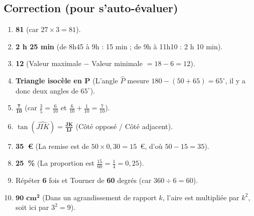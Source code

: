 \documentclass[a4paper,11pt]{article}
\begin{document}
\subsection*{Correction (pour s'auto-évaluer)}
\begin{enumerate}[label=\textbf{\arabic*.}]
    \item \textbf{81} (car $27 \times 3 = 81$).
    \item \textbf{2 h 25 min} (de 8h45 à 9h : 15 min ; de 9h à 11h10 : 2 h 10 min).
    \item \textbf{12} (Valeur maximale $-$ Valeur minimale $= 18 - 6 = 12$).
    \item \textbf{Triangle isocèle en P} (L'angle $\widehat{P}$ mesure $180 - (50 + 65) = 65^{\circ}$, il y a donc deux angles de $65^{\circ}$).
    \item $\mathbf{\frac{7}{10}}$ (car $\frac{3}{5} = \frac{6}{10}$ et $\frac{6}{10} + \frac{1}{10} = \frac{7}{10}$).
    \item $\tan(\widehat{JIK}) = \mathbf{\frac{JK}{IJ}}$ (Côté opposé / Côté adjacent).
    \item \textbf{35~€} (La remise est de $50 \times 0,30 = 15$~€, d'où $50 - 15 = 35$).
    \item \textbf{25~\%} (La proportion est $\frac{15}{60} = \frac{1}{4} = 0,25$).
    \item Répéter \textbf{6} fois et Tourner de \textbf{60} degrés (car $360 \div 6 = 60$).
    \item $\mathbf{90\text{ cm}^2}$ (Dans un agrandissement de rapport $k$, l'aire est multipliée par $k^2$, soit ici par $3^2 = 9$).
\end{enumerate}
\end{document}
